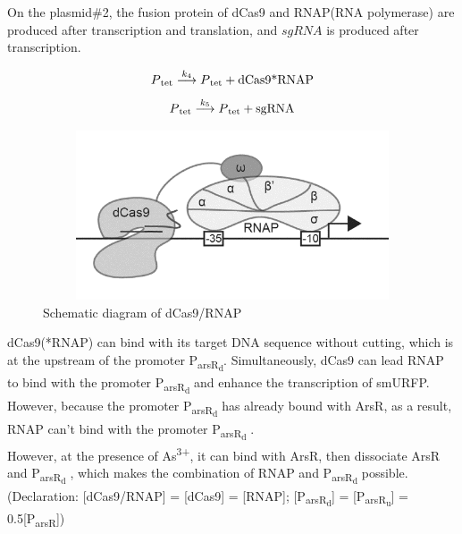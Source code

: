 On the plasmid\#2, the fusion protein of dCas9 and RNAP(RNA polymerase) are produced after transcription and translation, and $sgRNA$ is produced after transcription.

\begin{equation}
P\textsubscript{tet} \stackrel{k_{4}}{\longrightarrow} P\textsubscript{tet} +\text{dCas9*RNAP}
\end{equation}
\begin{equation}
P\textsubscript{tet} \stackrel{k_{5}}{\longrightarrow} P\textsubscript{tet} +\text{sgRNA}
\end{equation}

\begin{figure}[h]
	\centering
	\includegraphics[width=12cm,height=5cm]{2}
	\caption{Schematic diagram of dCas9/RNAP}
\end{figure}

dCas9(*RNAP) can bind with its target DNA sequence without cutting, which is at the upstream of the promoter P\textsubscript{arsR\textsubscript{d}}. Simultaneously, dCas9 can lead RNAP to bind with the promoter P\textsubscript{arsR\textsubscript{d}} and enhance the transcription of smURFP. However, because the promoter P\textsubscript{arsR\textsubscript{d}} has already bound with ArsR, as a result, RNAP can't bind with the promoter P\textsubscript{arsR\textsubscript{d}} \cite{bikard2013programmable}. \\ 

However, at the presence of As\textsuperscript{3+}, it can bind with ArsR, then dissociate ArsR and P\textsubscript{arsR\textsubscript{d}} , which makes the combination of RNAP and P\textsubscript{arsR\textsubscript{d}} possible. \\

(Declaration: [dCas9/RNAP] = [dCas9] = [RNAP]; [P\textsubscript{arsR\textsubscript{d}}] = [P\textsubscript{arsR\textsubscript{u}}] = 0.5{[P\textsubscript{arsR}]})

